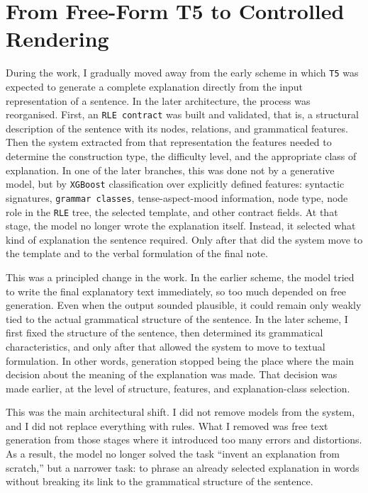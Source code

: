 \documentclass[12pt,a4paper,oneside]{report}
\begin{document}
\section{From Free-Form T5 to Controlled Rendering}
During the work, I gradually moved away from the early scheme in which \texttt{T5} was expected to generate a complete explanation directly from the input representation of a sentence. In the later architecture, the process was reorganised. First, an \texttt{RLE contract} was built and validated, that is, a structural description of the sentence with its nodes, relations, and grammatical features. Then the system extracted from that representation the features needed to determine the construction type, the difficulty level, and the appropriate class of explanation. In one of the later branches, this was done not by a generative model, but by \texttt{XGBoost} classification over explicitly defined features: syntactic signatures, \texttt{grammar classes}, tense-aspect-mood information, node type, node role in the \texttt{RLE} tree, the selected template, and other contract fields. At that stage, the model no longer wrote the explanation itself. Instead, it selected what kind of explanation the sentence required. Only after that did the system move to the template and to the verbal formulation of the final note.

This was a principled change in the work. In the earlier scheme, the model tried to write the final explanatory text immediately, so too much depended on free generation. Even when the output sounded plausible, it could remain only weakly tied to the actual grammatical structure of the sentence. In the later scheme, I first fixed the structure of the sentence, then determined its grammatical characteristics, and only after that allowed the system to move to textual formulation. In other words, generation stopped being the place where the main decision about the meaning of the explanation was made. That decision was made earlier, at the level of structure, features, and explanation-class selection.

This was the main architectural shift. I did not remove models from the system, and I did not replace everything with rules. What I removed was free text generation from those stages where it introduced too many errors and distortions. As a result, the model no longer solved the task ``invent an explanation from scratch,'' but a narrower task: to phrase an already selected explanation in words without breaking its link to the grammatical structure of the sentence.
\end{document}
